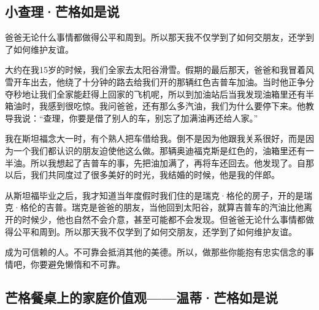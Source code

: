 \renewcommand{\bookchapter}{3}
\cleardoublepage
{}

\subsection*{小查理·芒格如是说}

\begin{WisdomBox}
\par

爸爸无论什么事情都做得公平和周到。所以那天我不仅学到了如何交朋友，还学到了如何维护友谊。
\par
\end{WisdomBox}

大约在我15岁的时候，我们全家去太阳谷滑雪。假期的最后那天，爸爸和我冒着风雪开车出去，他绕了十分钟的路去给我们开的那辆红色吉普车加油。当时他正争分夺秒地让我们全家能赶得上回家的飞机呢，所以到加油站后当我发现油箱里还有半箱油时，我感到很吃惊。我问爸爸，还有那么多汽油，我们为什么要停下来。他教导我说：“查理，你要是借了别人的车，别忘了加满油再还给人家。”
\par

我在斯坦福念大一时，有个熟人把车借给我。倒不是因为他跟我关系很好，而是因为一个我们都认识的朋友迫使他这么做。那辆奥迪福克斯是红色的，油箱里还有一半油。所以我想起了吉普车的事，先把油加满了，再将车还回去。他发现了。自那以后，我们共同度过了很多美好的时光，我结婚的时候，他是我的伴郎。
\par

从斯坦福毕业之后，我才知道当年度假时我们住的是瑞克·格伦的房子，开的是瑞克·格伦的吉普。瑞克是爸爸的朋友，当他回到太阳谷，就算吉普车的汽油比他离开的时候少，他也自然不会介意，甚至可能都不会发现。但爸爸无论什么事情都做得公平和周到。所以那天我不仅学到了如何交朋友，还学到了如何维护友谊。
\par

\begin{WisdomBox}
\par

成为可信赖的人。不可靠会抵消其他的美德。所以，做那些你能抱有忠实信念的事情吧，你要避免懒惰和不可靠。
\par
\end{WisdomBox}

\subsection*{芒格餐桌上的家庭价值观——温蒂·芒格如是说}

